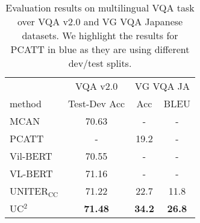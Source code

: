 \documentclass[final]{cvpr}
\newcommand{\jj}[1]{\textcolor{red}{\small{\bf [JJ: #1 ]}}}
\newcommand{\mingyang}[1]{\textcolor{brown}{\small{\bf [Mingyang: #1 ]}}}
\newcommand{\linjie}[1]{\textcolor{asparagus}{\small{\bf [Linjie: #1 ]}}}
\begin{document}
\begin{table}[!]
\small
\centering
\begin{tabular}{l|c|cc}
\hline
& VQA v2.0                              & \multicolumn{2}{c}{VG VQA JA} \\
method & Test-Dev Acc & Acc & BLEU \\
\hline
MCAN \cite{MCAN}                        & 70.63                                & -                                    & -                                    \\ 
PCATT  \cite{vqa_ja}                      & -                                     & 19.2                                 & -                                    \\ \hline
Vil-BERT \cite{vilbert}                    & 70.55                                 & -                                    & -                                    \\ 
VL-BERT \cite{su2020vlbert}                      & 71.16                                 & -                                    & -                                    \\ \hline
UNITER$_{\text{CC}}$ \cite{UNITER}                       &  71.22 & 22.7                             & 11.8                             \\ \hline
UC$^2$                       &  \textbf{71.48}          & \textbf{34.2} & \textbf{26.8} \\ \hline
\end{tabular}
\caption{\label{tab:vqa} Evaluation results on multilingual VQA task over VQA v2.0 and VG VQA Japanese datasets. We highlight the results for PCATT in {\color[HTML]{0000FF}blue} as they are using different dev/test splits.}


\end{table}
\end{document}

